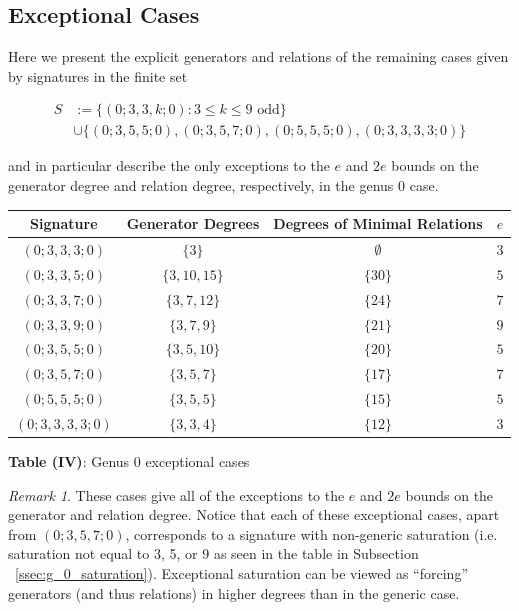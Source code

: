 \documentclass{amsart}
\theoremstyle{plain}
\theoremstyle{definition}
\theoremstyle{remark}
\newtheorem{rem}[thm]{Remark}
\numberwithin{equation}{section}
\newcommand\ssec{\subsection}
\begin{document}
\ssec{Exceptional Cases}
\label{ssec:g_0_exceptional}
Here we present the explicit generators and relations of the remaining
cases given by signatures in the finite set

\begin{align*}
	S &:= \{(0; 3, 3, k; 0) : 3 \leq k \leq 9 \text{ odd}\} \\
		&\cup \{(0; 3, 5, 5; 0) ,(0; 3, 5, 7; 0), (0; 5, 5, 5; 0), (0; 3, 3, 3, 3; 0)\}
\end{align*}

\noindent
and in particular describe the only exceptions to the $e$ and $2e$
bounds on the generator degree and relation degree, respectively,
in the genus 0 case.

\begin{longtable}
	{| c || c | c | c |}
	\hline
	Signature & Generator Degrees & Degrees of Minimal Relations & $e$ \\
	\hline
	\hline

	$(0; 3, 3, 3; 0)$ & $\{3\}$ & $\emptyset$ & $3$ \\	\hline

	$(0; 3, 3, 5; 0)$ & $\{3, 10, 15\}$ & $\{30\}$ & $5$ \\	\hline
	
	$(0; 3, 3, 7; 0)$ & $\{3, 7, 12\}$ & $\{24\}$ & $7$ \\	\hline
	
	$(0; 3, 3, 9; 0)$ & $\{3, 7, 9\}$ & $\{21\}$ & $9$ \\	\hline
	
	$(0; 3, 5, 5; 0)$ & $\{3, 5, 10\}$ & $\{20\}$ & $5$ \\	\hline
	
	$(0; 3, 5, 7; 0)$ & $\{3, 5, 7\}$ & $\{17\}$ & $7$ \\	\hline
	
	$(0; 5, 5, 5; 0)$ & $\{3, 5, 5\}$ & $\{15\}$ & $5$ \\	\hline
	
	$(0; 3, 3, 3, 3; 0)$ & $\{3, 3, 4\}$ & $\{12\}$ & $3$ \\	\hline
\end{longtable}

\begin{center}
\label{table:g-0-exceptional}
\textbf{Table (IV)}: Genus 0 exceptional cases
\end{center}

\begin{rem}
These cases give all of the exceptions to the $e$ and $2e$ bounds on
the generator and relation degree. Notice that each of these
exceptional cases, apart from $(0; 3, 5, 7; 0)$, corresponds to a
signature with non-generic saturation (i.e. saturation not equal to
3, 5, or 9 as seen in the table in Subsection
~\ref{ssec:g_0_saturation}). Exceptional saturation can be viewed as
``forcing'' generators (and thus relations) in higher degrees than
in the generic case.
\end{rem}
\end{document}
